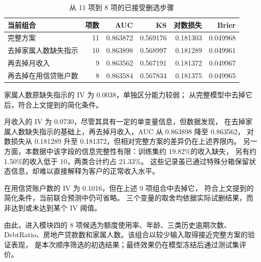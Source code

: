 \begin{table}[!htbp]
  \centering
  \caption{从 11 项到 8 项的已接受删选步骤}
  \label{tab:accepted-removals}
  \footnotesize
  \setlength{\tabcolsep}{4pt}
  \renewcommand{\arraystretch}{1.05}
  \begin{tabular}{lrrrrr}
    \toprule
    当前组合 & 项数 & AUC & KS & 对数损失 & Brier \\
    \midrule
    完整方案 & 11 & 0.863872 & 0.569176 & 0.181303 & 0.049968 \\
    去掉家属人数缺失指示 & 10 & 0.863898 & 0.568997 & 0.181289 & 0.049961 \\
    再去掉月收入 & 9 & 0.863562 & 0.567191 & 0.181372 & 0.049967 \\
    再去掉在用信贷账户数 & 8 & 0.863584 & 0.567834 & 0.181375 & 0.049965 \\
    \bottomrule
  \end{tabular}
  \begin{minipage}{\linewidth}
    \footnotesize
  \end{minipage}
\end{table}

家属人数原缺失指示的 IV 为 0.0038，单独区分能力较弱；
从完整模型中去掉它后，符合上文提到的简化条件。

月收入的 IV 为 0.0730，尽管其具有一定的单变量信息，但数据发现，
在去掉家属人数缺失指示的基础上，再去掉月收入，AUC 从 0.863898 降至 0.863562，
对数损失从 0.181289 升至 0.181372，但相对完整方案的差异仍在上述界限内。
另一方面，本数据中该字段的信息完整性有限：训练集约 19.82\%的收入缺失，
另有约 1.50\%的收入低于 10，两类合计约占 21.33\%。
这些记录虽已通过特殊分箱保留状态信息，却难以直接解释为客户的正常收入水平。

在用信贷账户数的 IV 为 0.1016，但在上述 9 项组合中去掉它，
符合上文提到的简化条件，当前联合预测中仍可省略。
三个变量的取舍均依据实际试删结果，而非达到或未达到某个 IV 阈值。

由此，进入模块四的 8 项候选为额度使用率、年龄、三类历史逾期次数、
DebtRatio、房地产贷款数和家属人数。该组合以较少输入取得接近完整方案的验证表现，
是本次顺序筛选的初选结果；最终效果仍在模型冻结后通过测试集评价。

